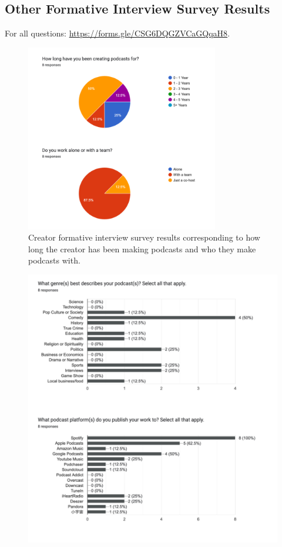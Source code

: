 \documentclass[12pt]{report}
\begin{document}
\begin{myfont}
        
        
        
        \clearpage
        
        
        \appendix
        \chapter{Other Formative Interview Survey Results}
        \label{app:A}
        For all questions: \url{https://forms.gle/CSG6DQGZVCaGQqaH8}.
        \begin{figure}[H]
        \centering
          \includegraphics[width=0.75\textwidth]{figures/formative2.png}
          \caption{Creator formative interview survey results corresponding to how long the creator has been making podcasts and who they make podcasts with.}
        \end{figure}
        \begin{figure}[H]
        \centering
          \includegraphics[width=1\textwidth]{figures/formative3.png}

\end{figure}
\end{myfont}
\end{document}
